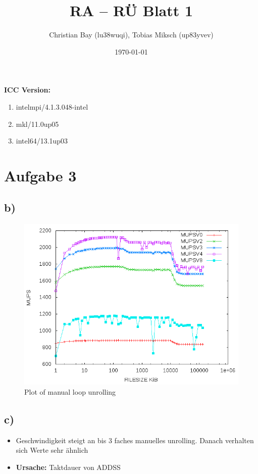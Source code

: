 \documentclass{article}
\title{RA -- R\"U Blatt 1}
\author{Christian Bay (lu38wuqi), Tobias Miksch (up83yvev)}
\date{\today}
\begin{document}
\maketitle

\textbf{ICC Version:}
\begin{enumerate}
	\item intelmpi/4.1.3.048-intel
	\item mkl/11.0up05
	\item intel64/13.1up03
\end{enumerate}

\vspace*{6pt}

\section*{Aufgabe 3}
\subsection*{b)}

\begin{center}
	\begin{figure}[h]
	\includegraphics[scale=0.6]{pics/a3b.png}
	\caption{Plot of manual loop unrolling}
	\end{figure}
\end{center}

\subsection*{c)}
\begin{itemize}
	\item Geschwindigkeit steigt an bis 3 faches manuelles unrolling.
		Danach verhalten sich Werte sehr ähnlich
	\item \textbf{Ursache:} Taktdauer von ADDSS
\end{itemize}
\end{document}
